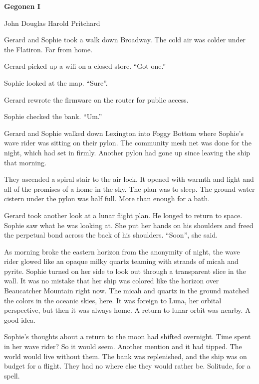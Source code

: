 

\centerline{\bf Gegonen I}

\smallskip

\centerline{John Douglas Harold Pritchard}

\break


Gerard and Sophie took a walk down Broadway.  The cold air was colder
under the Flatiron.  Far from home.



Gerard picked up a wifi on a closed store.  ``Got one.''

Sophie looked at the map.  ``Sure''.

Gerard rewrote the firmware on the router for public access.

Sophie checked the bank.  ``Um.''



Gerard and Sophie walked down Lexington into Foggy Bottom where
Sophie's wave rider was sitting on their pylon.  The community mesh
net was done for the night, which had set in firmly.  Another pylon
had gone up since leaving the ship that morning.

They ascended a spiral stair to the air lock.  It opened with warmth
and light and all of the promises of a home in the sky.  The plan was
to sleep.  The ground water cistern under the pylon was half full.
More than enough for a bath.

Gerard took another look at a lunar flight plan.  He longed to return
to space.  Sophie saw what he was looking at.  She put her hands on
his shoulders and freed the perpetual bond across the back of his
shoulders.  ``Soon'', she said.



As morning broke the eastern horizon from the anonymity of night, the
wave rider glowed like an opaque milky quartz teaming with strands of
micah and pyrite.  Sophie turned on her side to look out through a
transparent slice in the wall.  It was no mistake that her ship was
colored like the horizon over Beaucatcher Mountain right now.  The
micah and quartz in the ground matched the colors in the oceanic
skies, here.  It was foreign to Luna, her orbital perspective, but
then it was always home.  A return to lunar orbit was nearby.  A good
idea.



Sophie's thoughts about a return to the moon had shifted overnight.
Time spent in her wave rider?  So it would seem.  Another mention and
it had tipped.  The world would live without them.  The bank was
replenished, and the ship was on budget for a flight.  They had no
where else they would rather be.  Solitude, for a spell.



